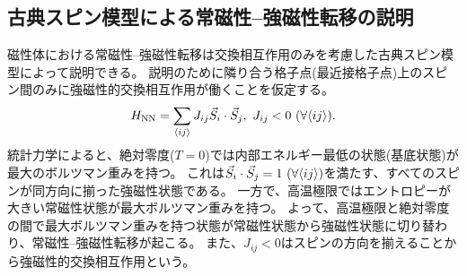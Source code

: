 \documentclass[12pt,titlepage,dvipdfmx]{jarticle}
\begin{document}
\subsection{古典スピン模型による常磁性--強磁性転移の説明}
磁性体における常磁性--強磁性転移は交換相互作用のみを考慮した古典スピン模型によって説明できる。
説明のために隣り合う格子点(最近接格子点)上のスピン間のみに強磁性的交換相互作用が働くことを仮定する。
\begin{align}
   H_{\mathrm{NN}} = \sum_{\ev{ij}} J_{ij} \vec{S}_i\cdot \vec{S}_j,\ J_{ij}<0\ (\forall{\ev{ij}}).
\end{align}
統計力学によると、絶対零度($T=0$)では内部エネルギー最低の状態(基底状態)が最大のボルツマン重みを持つ。
これは$\vec{S}_i\cdot\vec{S}_j=1\ (\forall{\ev{ij}})$を満たす、すべてのスピンが同方向に揃った強磁性状態である。
一方で、高温極限ではエントロピーが大きい常磁性状態が最大ボルツマン重みを持つ。
よって、高温極限と絶対零度の間で最大ボルツマン重みを持つ状態が常磁性状態から強磁性状態に切り替わり、常磁性--強磁性転移が起こる。
また、$J_{ij}<0$はスピンの方向を揃えることから強磁性的交換相互作用という。

%


\end{document}
